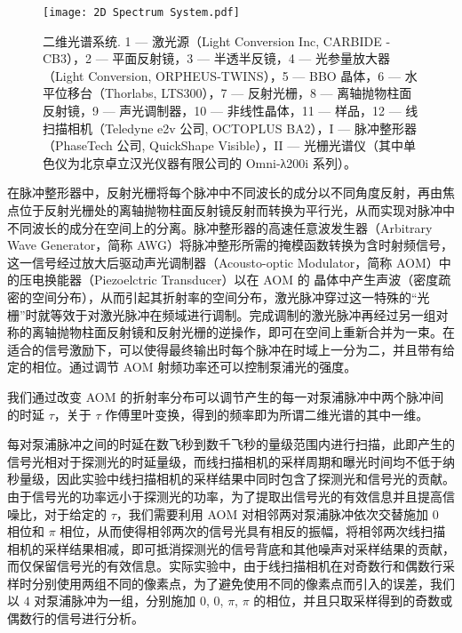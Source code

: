 \documentclass{thesis}
\begin{document}
\begin{figure}[h!]
    \centering
    \texttt{[image: 2D Spectrum System.pdf]}
    \caption{二维光谱系统. \textcircled{\footnotesize{1}} --- 激光源（Light Conversion Inc, CARBIDE - CB3），\textcircled{\footnotesize{2}} --- 平面反射镜，\textcircled{\footnotesize{3}} --- 半透半反镜，\textcircled{\footnotesize{4}} --- 光参量放大器（Light Conversion, ORPHEUS-TWINS），\textcircled{\footnotesize{5}} --- BBO 晶体，\textcircled{\footnotesize{6}} --- 水平位移台（Thorlabs, LTS300），\textcircled{\footnotesize{7}} --- 反射光栅，\textcircled{\footnotesize{8}} --- 离轴抛物柱面反射镜，\textcircled{\footnotesize{9}} --- 声光调制器，\textcircled{\footnotesize{10}} --- 非线性晶体，\textcircled{\footnotesize{11}} --- 样品，\textcircled{\footnotesize{12}} --- 线扫描相机（Teledyne e2v 公司, OCTOPLUS BA2），I --- 脉冲整形器（PhaseTech 公司, QuickShape Visible），II --- 光栅光谱仪（其中单色仪为北京卓立汉光仪器有限公司的 Omni-λ200i 系列）。}
    \label{2D Spectrum System}
\end{figure}

在脉冲整形器中，反射光栅将每个脉冲中不同波长的成分以不同角度反射，再由焦点位于反射光栅处的离轴抛物柱面反射镜反射而转换为平行光，从而实现对脉冲中不同波长的成分在空间上的分离。脉冲整形器的高速任意波发生器（Arbitrary Wave Generator，简称 AWG）将脉冲整形所需的掩模函数转换为含时射频信号，这一信号经过放大后驱动声光调制器（Acousto-optic Modulator，简称 AOM）中的压电换能器（Piezoelctric Transducer）以在 AOM 的  晶体中产生声波（密度疏密的空间分布），从而引起其折射率的空间分布，激光脉冲穿过这一特殊的“光栅”时就等效于对激光脉冲在频域进行调制。完成调制的激光脉冲再经过另一组对称的离轴抛物柱面反射镜和反射光栅的逆操作，即可在空间上重新合并为一束。在适合的信号激励下，可以使得最终输出时每个脉冲在时域上一分为二，并且带有给定的相位。通过调节 AOM 射频功率还可以控制泵浦光的强度。

我们通过改变 AOM 的折射率分布可以调节产生的每一对泵浦脉冲中两个脉冲间的时延 $\tau$，关于 $\tau$ 作傅里叶变换，得到的频率即为所谓二维光谱的其中一维。

每对泵浦脉冲之间的时延在数飞秒到数千飞秒的量级范围内进行扫描，此即产生的信号光相对于探测光的时延量级，而线扫描相机的采样周期和曝光时间均不低于纳秒量级，因此实验中线扫描相机的采样结果中同时包含了探测光和信号光的贡献。由于信号光的功率远小于探测光的功率，为了提取出信号光的有效信息并且提高信噪比，对于给定的 $\tau$，我们需要利用 AOM 对相邻两对泵浦脉冲依次交替施加 $0$ 相位和 $\pi$ 相位，从而使得相邻两次的信号光具有相反的振幅，将相邻两次线扫描相机的采样结果相减，即可抵消探测光的信号背底和其他噪声对采样结果的贡献，而仅保留信号光的有效信息。实际实验中，由于线扫描相机在对奇数行和偶数行采样时分别使用两组不同的像素点，为了避免使用不同的像素点而引入的误差，我们以 $4$ 对泵浦脉冲为一组，分别施加 $0$, $0$, $\pi$, $\pi$ 的相位，并且只取采样得到的奇数或偶数行的信号进行分析。
\end{document}
